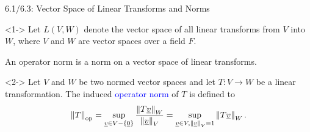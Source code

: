 \documentclass[10pt,letterpaper,english]{beamer}
\begin{document}
\begin{frame}{6.1/6.3: Vector Space of Linear Transforms and Norms}

\begin{definition}<1->
Let $L(V,W)$ denote the vector space of all linear transforms from $V$ into $W$, where $V$ and $W$ are vector spaces over a field $F$.
\end{definition}

An operator norm is a norm on a vector space of linear transforms.

\begin{definition}<2->
Let $V$ and $W$ be two normed vector spaces and let $T \colon V \rightarrow W$ be a linear transformation.
The induced \textcolor{blue}{operator norm} of $T$ is defined to
\begin{equation*}
\left\| T \right\|_{\mathrm{op}}
= \sup_{ \underline{v} \in V - \left\{ \underline{0} \right\} }
\frac{ \left\| T \underline{v} \right\|_W }{ \left\| \underline{v} \right\|_V }
= \sup_{\underline{v} \in V, \left\| \underline{v} \right\|_V = 1 }
\left\| T \underline{v} \right\|_W .
\end{equation*}
\end{definition}

\vspace{1.5mm}


\end{frame}
\end{document}
